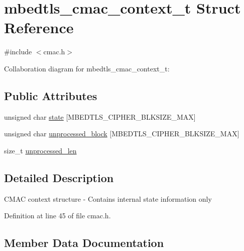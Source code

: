 \hypertarget{structmbedtls__cmac__context__t}{}\section{mbedtls\+\_\+cmac\+\_\+context\+\_\+t Struct Reference}
\label{structmbedtls__cmac__context__t}


{\ttfamily \#include $<$cmac.\+h$>$}



Collaboration diagram for mbedtls\+\_\+cmac\+\_\+context\+\_\+t\+:
\subsection*{Public Attributes}
\begin{DoxyCompactItemize}
\item 
unsigned char \mbox{\hyperlink{structmbedtls__cmac__context__t_ae87d681008dd82481a5b97559db68010}{state}} \mbox{[}M\+B\+E\+D\+T\+L\+S\+\_\+\+C\+I\+P\+H\+E\+R\+\_\+\+B\+L\+K\+S\+I\+Z\+E\+\_\+\+M\+AX\mbox{]}
\item 
unsigned char \mbox{\hyperlink{structmbedtls__cmac__context__t_a2d58c18be7180b1284a06f2a29291663}{unprocessed\+\_\+block}} \mbox{[}M\+B\+E\+D\+T\+L\+S\+\_\+\+C\+I\+P\+H\+E\+R\+\_\+\+B\+L\+K\+S\+I\+Z\+E\+\_\+\+M\+AX\mbox{]}
\item 
size\+\_\+t \mbox{\hyperlink{structmbedtls__cmac__context__t_a96b77ca1c7dba6980356a37086870fab}{unprocessed\+\_\+len}}
\end{DoxyCompactItemize}


\subsection{Detailed Description}
C\+M\+AC context structure -\/ Contains internal state information only 

Definition at line 45 of file cmac.\+h.



\subsection{Member Data Documentation}
\mbox{\label{structmbedtls__cmac__context__t_ae87d681008dd82481a5b97559db68010}} 
